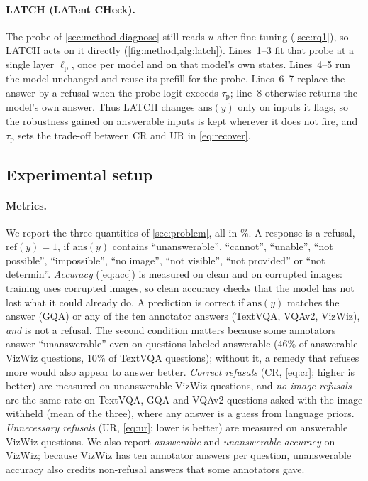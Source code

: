 \paragraph{LATCH (LATent CHeck).}
The probe of \cref{sec:method-diagnose} still reads $u$ after fine-tuning (\cref{sec:rq1}),
so LATCH acts on it directly (\cref{fig:method,alg:latch}). Lines~1--3 fit that probe at a
single layer $\ell_{\mathrm{p}}$, once per model and on that model's own states. Lines~4--5
run the model unchanged and reuse its prefill for the probe. Lines~6--7 replace the answer by
a refusal when the probe logit exceeds $\tau_{\mathrm{p}}$; line~8 otherwise returns the
model's own answer. Thus LATCH changes $\mathrm{ans}(y)$ only on inputs it flags, so
the robustness gained on answerable inputs is kept wherever it does not fire, and
$\tau_{\mathrm{p}}$ sets the trade-off between $\mathrm{CR}$ and $\mathrm{UR}$ in
\cref{eq:recover}.

\subsection{Experimental setup}
\label{sec:setup}

\paragraph{Metrics.}
We report the three quantities of \cref{sec:problem}, all in \%. A response is a
refusal, $\mathrm{ref}(y) = 1$, if $\mathrm{ans}(y)$ contains ``unanswerable'',
``cannot'', ``unable'', ``not possible'', ``impossible'', ``no image'', ``not visible'',
``not provided'' or ``not determin''. \emph{Accuracy} (\cref{eq:acc}) is measured on
clean and on corrupted images: training uses corrupted images, so clean accuracy checks
that the model has not lost what it could already do. A prediction is correct if
$\mathrm{ans}(y)$ matches the answer (GQA) or any of the ten annotator answers (TextVQA,
VQAv2, VizWiz), \emph{and} is not a refusal. The second condition matters because some
annotators answer ``unanswerable'' even on questions labeled answerable ($46\%$ of
answerable VizWiz questions, $10\%$ of TextVQA questions); without it, a remedy that
refuses more would also appear to answer better. \emph{Correct refusals} ($\mathrm{CR}$,
\cref{eq:cr}; higher is better) are measured on unanswerable VizWiz questions, and
\emph{no-image refusals} are the same rate on TextVQA, GQA and VQAv2 questions asked
with the image withheld (mean of the three), where any answer is a guess from language
priors. \emph{Unnecessary refusals} ($\mathrm{UR}$, \cref{eq:ur}; lower is better) are
measured on answerable VizWiz questions. We also report \emph{answerable} and
\emph{unanswerable accuracy} on VizWiz; because VizWiz has ten annotator answers per
question, unanswerable accuracy also credits non-refusal answers that some annotators
gave.

